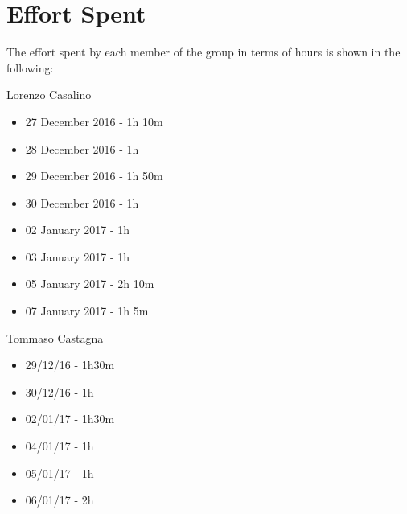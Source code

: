 \section{Effort Spent}

The effort spent by each member of the group in terms of hours is shown in the following:

Lorenzo Casalino

\begin{itemize}
	\item 27 December 2016 - 1h 10m
	\item 28 December 2016 - 1h
	\item 29 December 2016 - 1h 50m
	\item 30 December 2016 - 1h
	\item 02 January  2017 - 1h
	\item 03 January  2017 - 1h
	\item 05 January  2017 - 2h 10m
	\item 07 January  2017 - 1h 5m
\end{itemize}

Tommaso Castagna

\begin{itemize}
	\item 29/12/16 - 1h30m
	\item 30/12/16 - 1h
	\item 02/01/17 - 1h30m
	\item 04/01/17 - 1h
	\item 05/01/17 - 1h
	\item 06/01/17 - 2h
\end{itemize}
